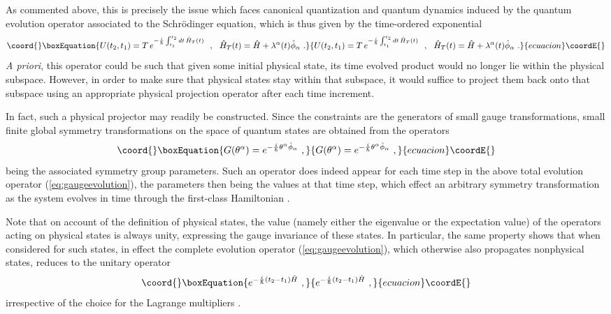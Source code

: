\documentclass[a4paper,11pt]{article}
\begin{document}
As commented above, this is precisely the issue which faces canonical 
quantization and quantum dynamics induced by the quantum evolution 
ope\-ra\-tor associated to the Schr\"odinger equation, which is thus given 
by the time-ordered exponential
\begin{equation}\coord{}\boxEquation{
U(t_2,t_1)=T\,e^{-\frac{i}{\hbar}\int_{t_1}^{t_2}dt\,\hat{H}_T(t)}\ \ ,\ \ 
\hat{H}_T(t)=\hat{H}+\lambda^\alpha(t)\hat{\phi}_\alpha\ .
\label{eq:gaugeevolution}
}{
U(t_2,t_1)=T\,e^{-\frac{i}{\hbar}\int_{t_1}^{t_2}dt\,\hat{H}_T(t)}\ \ ,\ \ 
\hat{H}_T(t)=\hat{H}+\lambda^\alpha(t)\hat{\phi}_\alpha\ .
}{ecuacion}\coordE{}\end{equation}
{\sl A priori\/}, this operator could be such that given some initial physical
state, its time evolved product would no longer lie within the physical 
subspace. However, in order to make sure that physical states stay within
that subspace, it would suffice to project them back onto that subspace
using an appropriate physical projection operator after each time 
increment.\cite{Klaud1}

In fact, such a physical projector may readily be constructed.\cite{Klaud1} 
Since the constraints \myHighlight{$\hat{\phi}_\alpha$}\coordHE{} are the generators of small gauge
transformations, small finite global symmetry transformations on the space 
of quantum states are obtained from the operators
\begin{equation}\coord{}\boxEquation{
G(\theta^\alpha)=e^{-\frac{i}{\hbar}\theta^\alpha\hat{\phi}_\alpha}\ ,
\label{eq:symmetryG}
}{
G(\theta^\alpha)=e^{-\frac{i}{\hbar}\theta^\alpha\hat{\phi}_\alpha}\ ,
}{ecuacion}\coordE{}\end{equation}
\myHighlight{$\theta^\alpha$}\coordHE{} being the associated symmetry group parameters.
Such an operator does indeed appear for each time step in the above
total evolution operator (\ref{eq:gaugeevolution}), the parameters
then being the values \myHighlight{$\lambda^\alpha(t)$}\coordHE{} at that time step, which
effect an arbitrary symmetry transformation as the system evolves in time
through the first-class Hamiltonian \myHighlight{$\hat{H}$}\coordHE{}.

Note that on account of the definition of physical states, the value
(namely either the eigenvalue or the expectation value) of the operators
\myHighlight{$G(\theta^\alpha)$}\coordHE{} acting on physical states is always unity, expressing
the gauge invariance of these states. In particular, the same property
shows that when considered for such states, in effect the complete
evolution operator (\ref{eq:gaugeevolution}), which otherwise also propagates
nonphysical states, reduces to the unitary operator
\begin{equation}\coord{}\boxEquation{
e^{-\frac{i}{\hbar}(t_2-t_1)\hat{H}}\ ,
}{
e^{-\frac{i}{\hbar}(t_2-t_1)\hat{H}}\ ,
}{ecuacion}\coordE{}\end{equation}
irrespective of the choice for the Lagrange multipliers \coordHE{}.
\end{document}
